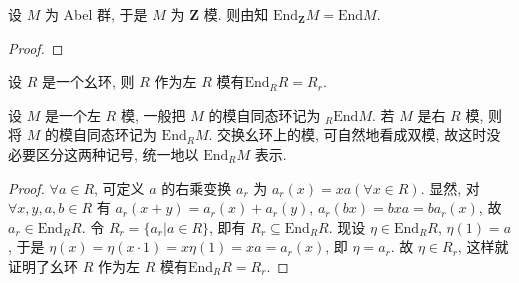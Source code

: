 \documentclass[../../main.tex]{subfiles}
\begin{document}
\begin{example}
设 \( M \) 为 Abel 群, 于是 \( M \) 为 \( \mathbf{Z} \) 模. 则由知 \( \text{End}_\mathbf{Z} M = \text{End}M \).
\end{example}
\begin{proof}


\end{proof}

\begin{example}
设 \( R \) 是一个幺环, 则 \( R \) 作为左 \( R \) 模有\( \text{End}_R R = R_r \).
\end{example}
\begin{remark}
设 \( M \) 是一个左 \( R \) 模, 一般把 \( M \) 的模自同态环记为 \( _R\text{End}M \). 若 \( M \) 是右 \( R \) 模, 则将 \( M \) 的模自同态环记为 \( \text{End}_R M \). 交换幺环上的模, 可自然地看成双模, 故这时没必要区分这两种记号, 统一地以 \( \text{End}_R M \) 表示.
\end{remark}
\begin{proof}
\( \forall a \in R \), 可定义 \( a \) 的右乘变换 \( a_r \) 为 \( a_r(x) = xa (\forall x \in R) \). 显然, 对 \( \forall x, y, a, b \in R \) 有 \( a_r(x + y) = a_r(x) + a_r(y) \), \( a_r(bx) = bxa = ba_r(x) \), 故 \( a_r \in \text{End}_R R \). 令 \( R_r = \{a_r|a \in R\} \), 即有 \( R_r \subseteq \text{End}_R R \). 现设 \( \eta \in \text{End}_R R \), \( \eta(1) = a \), 于是 \( \eta(x) = \eta(x \cdot 1) = x\eta(1) = xa = a_r(x) \), 即 \( \eta = a_r \). 故 \( \eta \in R_r \), 这样就证明了幺环 \( R \) 作为左 \( R \) 模有\( \text{End}_R R = R_r \).

\end{proof}
\end{document}
